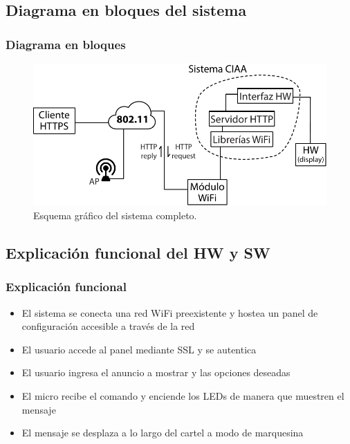 \subsection{Diagrama en bloques del sistema}
\begin{frame}
	\frametitle{Diagrama en bloques}
	\begin{figure}[htbp]
		\begin{center}
			\includegraphics[width=\textwidth]{diagramas/diagrama-bloques-2.pdf}
			\caption{Esquema gráfico del sistema completo.}
			\label{fig:diagrama-bloques}
		\end{center}
	\end{figure}
\end{frame}

\subsection{Explicación funcional del HW y SW}
\begin{frame}
	\frametitle{Explicación funcional}
	\begin{itemize}
		 \item El sistema se conecta una red WiFi preexistente y hostea un panel de configuración accesible a través de la red
		 \item El usuario accede al  panel mediante SSL y se autentica
		 \item El usuario ingresa el anuncio a mostrar y las opciones deseadas
		 \item El micro recibe el comando y enciende los LEDs de manera que muestren el mensaje
		 \item El mensaje se desplaza a lo largo del cartel a modo de marquesina
	\end{itemize}
	

\end{frame}

